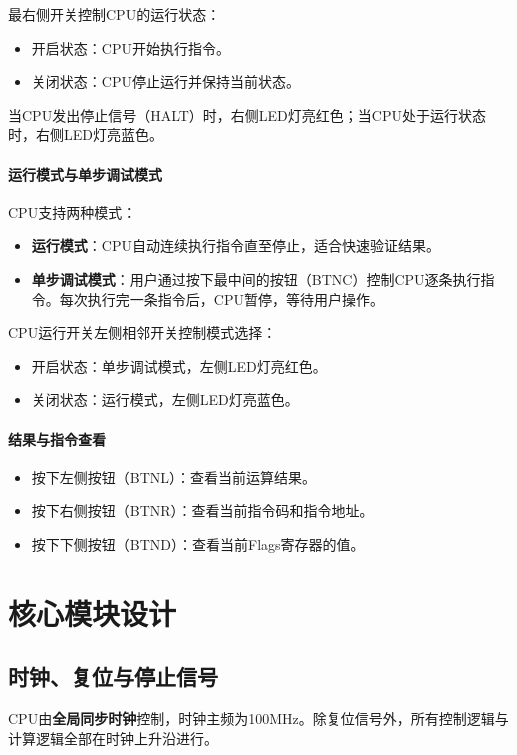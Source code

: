 \documentclass[lang=cn,a4paper,newtx]{elegantpaper}
\begin{document}
最右侧开关控制CPU的运行状态：
\begin{itemize}
  \item 开启状态：CPU开始执行指令。
  \item 关闭状态：CPU停止运行并保持当前状态。
\end{itemize}
当CPU发出停止信号（HALT）时，右侧LED灯亮红色；当CPU处于运行状态时，右侧LED灯亮蓝色。

\paragraph{运行模式与单步调试模式}

CPU支持两种模式：
\begin{itemize}
  \item \textbf{运行模式}：CPU自动连续执行指令直至停止，适合快速验证结果。
  \item \textbf{单步调试模式}：用户通过按下最中间的按钮（BTNC）控制CPU逐条执行指令。每次执行完一条指令后，CPU暂停，等待用户操作。
\end{itemize}

CPU运行开关左侧相邻开关控制模式选择：
\begin{itemize}
  \item 开启状态：单步调试模式，左侧LED灯亮红色。
  \item 关闭状态：运行模式，左侧LED灯亮蓝色。
\end{itemize}

\paragraph{结果与指令查看}

\begin{itemize}
  \item 按下左侧按钮（BTNL）：查看当前运算结果。
  \item 按下右侧按钮（BTNR）：查看当前指令码和指令地址。
  \item 按下下侧按钮（BTND）：查看当前Flags寄存器的值。
\end{itemize}
\section{核心模块设计}
\subsection{时钟、复位与停止信号}
CPU由\textbf{全局同步时钟}控制，时钟主频为100MHz。除复位信号外，所有控制逻辑与计算逻辑全部在时钟上升沿进行。
\end{document}
